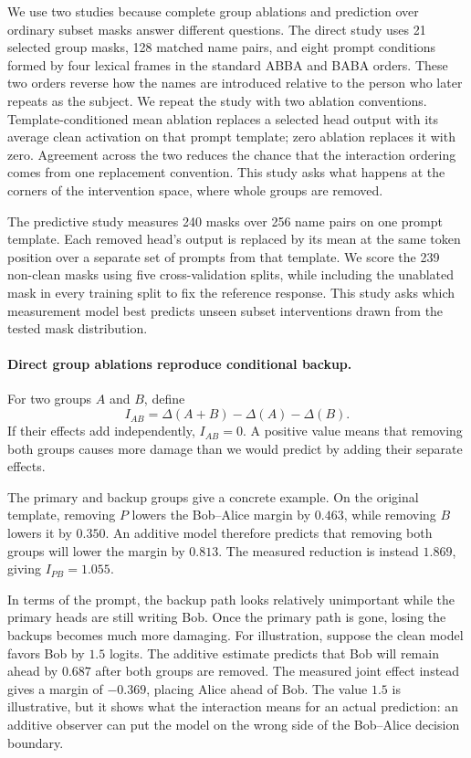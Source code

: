 \documentclass[sigconf,10pt,nonacm,balance=false]{acmart}
\begin{document}
We use two studies because complete group ablations and prediction over ordinary subset masks answer different questions. The direct study uses 21 selected group masks, 128 matched name pairs, and eight prompt conditions formed by four lexical frames in the standard ABBA and BABA orders. These two orders reverse how the names are introduced relative to the person who later repeats as the subject. We repeat the study with two ablation conventions. Template-conditioned mean ablation replaces a selected head output with its average clean activation on that prompt template; zero ablation replaces it with zero. Agreement across the two reduces the chance that the interaction ordering comes from one replacement convention. This study asks what happens at the corners of the intervention space, where whole groups are removed.

The predictive study measures 240 masks over 256 name pairs on one prompt template. Each removed head's output is replaced by its mean at the same token position over a separate set of prompts from that template. We score the 239 non-clean masks using five cross-validation splits, while including the unablated mask in every training split to fix the reference response. This study asks which measurement model best predicts unseen subset interventions drawn from the tested mask distribution.

\paragraph{Direct group ablations reproduce conditional backup.}

For two groups $A$ and $B$, define
\[
I_{AB}=\Delta(A+B)-\Delta(A)-\Delta(B).
\]
If their effects add independently, $I_{AB}=0$. A positive value means that removing both groups causes more damage than we would predict by adding their separate effects.

The primary and backup groups give a concrete example. On the original template, removing $P$ lowers the Bob--Alice margin by $0.463$, while removing $B$ lowers it by $0.350$. An additive model therefore predicts that removing both groups will lower the margin by $0.813$. The measured reduction is instead $1.869$, giving $I_{PB}=1.055$.

In terms of the prompt, the backup path looks relatively unimportant while the primary heads are still writing Bob. Once the primary path is gone, losing the backups becomes much more damaging. For illustration, suppose the clean model favors Bob by $1.5$ logits. The additive estimate predicts that Bob will remain ahead by $0.687$ after both groups are removed. The measured joint effect instead gives a margin of $-0.369$, placing Alice ahead of Bob. The value $1.5$ is illustrative, but it shows what the interaction means for an actual prediction: an additive observer can put the model on the wrong side of the Bob--Alice decision boundary.
\end{document}
